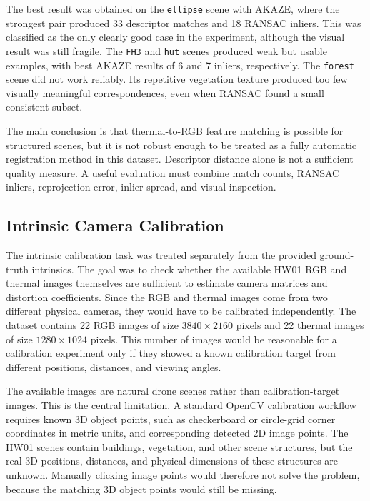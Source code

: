 The best result was obtained on the \texttt{ellipse} scene with AKAZE, where
the strongest pair produced 33 descriptor matches and 18 RANSAC inliers. This
was classified as the only clearly good case in the experiment, although the
visual result was still fragile. The \texttt{FH3} and \texttt{hut} scenes
produced weak but usable examples, with best AKAZE results of 6 and 7 inliers,
respectively. The \texttt{forest} scene did not work reliably. Its repetitive
vegetation texture produced too few visually meaningful correspondences, even
when RANSAC found a small consistent subset.

The main conclusion is that thermal-to-RGB feature matching is possible for
structured scenes, but it is not robust enough to be treated as a fully
automatic registration method in this dataset. Descriptor distance alone is not
a sufficient quality measure. A useful evaluation must combine match counts,
RANSAC inliers, reprojection error, inlier spread, and visual inspection.

\subsection{Intrinsic Camera Calibration}

The intrinsic calibration task was treated separately from the provided
ground-truth intrinsics. The goal was to check whether the available HW01 RGB
and thermal images themselves are sufficient to estimate camera matrices and
distortion coefficients. Since the RGB and thermal images come from two
different physical cameras, they would have to be calibrated independently. The
dataset contains 22 RGB images of size \(3840 \times 2160\) pixels and 22
thermal images of size \(1280 \times 1024\) pixels. This number of images would
be reasonable for a calibration experiment only if they showed a known
calibration target from different positions, distances, and viewing angles.

The available images are natural drone scenes rather than calibration-target
images. This is the central limitation. A standard OpenCV calibration workflow
requires known 3D object points, such as checkerboard or circle-grid corner
coordinates in metric units, and corresponding detected 2D image points. The
HW01 scenes contain buildings, vegetation, and other scene structures, but the
real 3D positions, distances, and physical dimensions of these structures are
unknown. Manually clicking image points would therefore not solve the problem,
because the matching 3D object points would still be missing.

